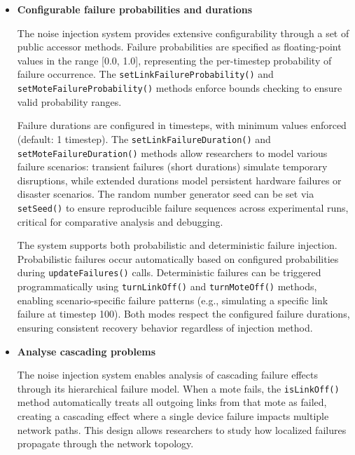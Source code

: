 \begin{itemize}
    Integration with the DTP/ITP action execution ensures that failed links receive zero traffic distribution, preventing the adaptive system from attempting to route packets through non-functional connections. The \texttt{DeltaIOTConnector} checks link status before performing power adjustments and distribution balancing, automatically redirecting traffic to operational links.
    
    \item \textbf{Configurable failure probabilities and durations}
    
    The noise injection system provides extensive configurability through a set of public accessor methods. Failure probabilities are specified as floating-point values in the range [0.0, 1.0], representing the per-timestep probability of failure occurrence. The \texttt{setLinkFailureProbability()} and \texttt{setMoteFailureProbability()} methods enforce bounds checking to ensure valid probability ranges.
    
    Failure durations are configured in timesteps, with minimum values enforced (default: 1 timestep). The \texttt{setLinkFailureDuration()} and \texttt{setMoteFailureDuration()} methods allow researchers to model various failure scenarios: transient failures (short durations) simulate temporary disruptions, while extended durations model persistent hardware failures or disaster scenarios. The random number generator seed can be set via \texttt{setSeed()} to ensure reproducible failure sequences across experimental runs, critical for comparative analysis and debugging.
    
    The system supports both probabilistic and deterministic failure injection. Probabilistic failures occur automatically based on configured probabilities during \texttt{updateFailures()} calls. Deterministic failures can be triggered programmatically using \texttt{turnLinkOff()} and \texttt{turnMoteOff()} methods, enabling scenario-specific failure patterns (e.g., simulating a specific link failure at timestep 100). Both modes respect the configured failure durations, ensuring consistent recovery behavior regardless of injection method.
    
    \item \textbf{Analyse cascading problems}
    
    The noise injection system enables analysis of cascading failure effects through its hierarchical failure model. When a mote fails, the \texttt{isLinkOff()} method automatically treats all outgoing links from that mote as failed, creating a cascading effect where a single device failure impacts multiple network paths. This design allows researchers to study how localized failures propagate through the network topology.
    

\end{itemize}
